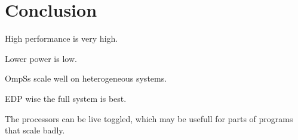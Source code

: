 \chapter[Conclusion]{Conclusion}








High performance is very high.

Lower power is low.

OmpSs scale well on heterogeneous systems.

EDP wise the full system is best.

The processors can be live toggled, which may be usefull for parts of programs that scale badly.
